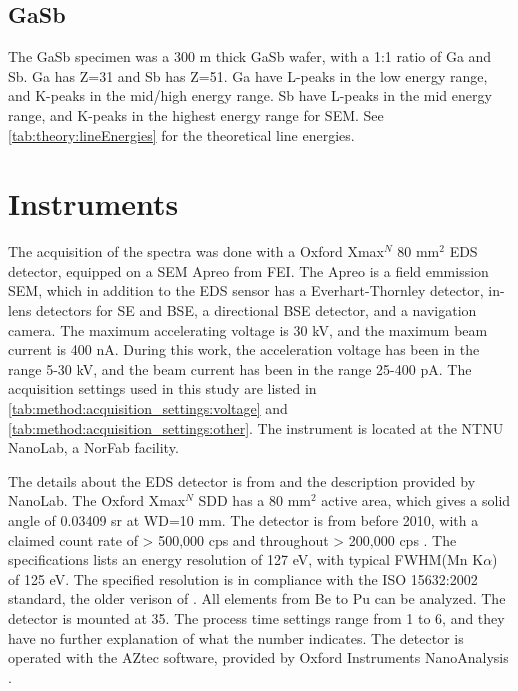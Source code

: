 

\subsection{GaSb}
\label{method:materials:gasb}

The GaSb specimen was a 300 \textmu m thick GaSb wafer, with a 1:1 ratio of Ga and Sb.
Ga has Z=31 and Sb has Z=51.
Ga have L-peaks in the low energy range, and K-peaks in the mid/high energy range.
Sb have L-peaks in the mid energy range, and K-peaks in the highest energy range for SEM.
See \cref{tab:theory:lineEnergies} for the theoretical line energies.







\section{Instruments}
\label{method:instruments}

The acquisition of the spectra was done with a Oxford Xmax$^N$ 80 mm$^2$ EDS detector, equipped on a SEM Apreo from FEI.
The Apreo is a field emmission SEM, which in addition to the EDS sensor has a Everhart-Thornley detector, in-lens detectors for SE and BSE, a directional BSE detector, and a navigation camera.
The maximum accelerating voltage is 30 kV, and the maximum beam current is 400 nA.
During this work, the acceleration voltage has been in the range 5-30 kV, and the beam current has been in the range 25-400 pA.
The acquisition settings used in this study are listed in \cref{tab:method:acquisition_settings:voltage} and \cref{tab:method:acquisition_settings:other}.
The instrument is located at the NTNU NanoLab, a NorFab facility.

The details about the EDS detector is from \cite{oxford_xmax_80} and the description provided by NanoLab.
The Oxford Xmax$^N$ SDD has a 80 mm$^2$ active area, which gives a solid angle of 0.03409 sr at WD=10 mm.
The detector is from before 2010, with a claimed count rate of > 500,000 cps and throughout > 200,000 cps \cite{oxford_xmax_80}.
The specifications lists an energy resolution of 127 eV, with typical FWHM(Mn K$\alpha$) of 125 eV.
The specified resolution is in compliance with the ISO 15632:2002 standard, the older verison of \cite{iso_qc_15632}.
All elements from Be to Pu can be analyzed.
The detector is mounted at 35\textdegree.
The process time settings range from 1 to 6, and they have no further explanation of what the number indicates.
The detector is operated with the AZtec software, provided by Oxford Instruments NanoAnalysis \cite{aztec_manual}.



